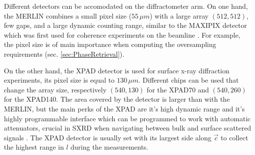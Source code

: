 Different detectors can be accomodated on the diffractometer arm.
On one hand, the MERLIN \parencite{BEWLEY20061029} combines a small pixel size ($55 \, \mu m$) with a large array $(512, 512)$, few gaps, and a large dynamic counting range, similar to the MAXIPIX detector \parencite{ponchut_maxipix_2011} which was first used for coherence experiments on the beamline \parencite{Schavkan2013, Li2020}.
For example, the pixel size is of main importance when computing the oversampling requirements (sec. \ref{sec:PhaseRetrieval}).

On the other hand, the XPAD detector \parencite{Basolo2005, Dawiec_2016} is used for surface x-ray diffraction experiments, its pixel size is equal to $130 \, \mu m$.
Different chips can be used that change the array size, respectively  $(540, 130)$ for the XPAD70 and $(540, 260)$ for the XPAD140.
The area covered by the detector is larger than with the MERLIN, but the main perks of the XPAD are it's high dynamic range and it's highly programmable interface \parencite{Fertey2013} which can be programmed to work with automatic attenuators, crucial in SXRD when navigating between bulk and surface scattered signals .
The XPAD detector is usually set with its largest side along $\vec{c}$ to collect the highest range in $l$ during the measurements.